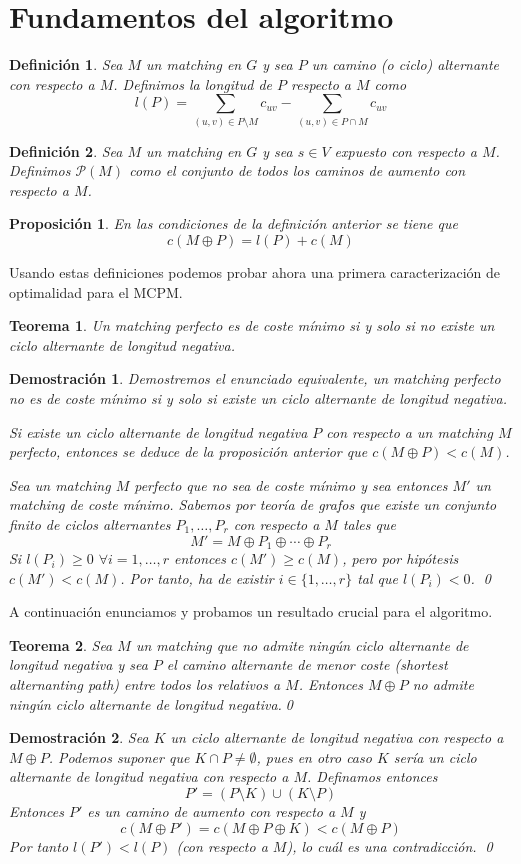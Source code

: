 \documentclass[twoside,a4paper,openright,12pt]{book}
\newtheorem{defi}{Definici\'on}[section]
\newtheorem{prop}{Proposici\'on}[section]
\newtheorem{thm}{Teorema}[section]
\newtheorem*{dem}{Demostración}
\begin{document}
\section{Fundamentos del algoritmo}
\begin{defi}
Sea $M$ un matching en $G$ y sea $P$ un camino (o ciclo) alternante con respecto a $M$. Definimos la longitud de $P$ respecto a $M$ como
$$
l(P) = \sum_{(u,v)\in P\setminus M}c_{uv} - \sum_{(u,v)\in P\cap M}c_{uv}
$$
\end{defi}
\begin{defi}
Sea $M$ un matching en $G$ y sea $s\in V$ expuesto con respecto a $M$. Definimos $\mathcal{P}(M)$ como el conjunto de todos los caminos de aumento con respecto a $M$.
\end{defi}
\begin{prop}
En las condiciones de la definición anterior se tiene que
$$
c(M\oplus P) = l(P) + c(M)
$$
\end{prop}

Usando estas definiciones podemos probar ahora una primera caracterización de optimalidad para el MCPM.
\begin{thm}
Un matching perfecto es de coste mínimo si y solo si no existe un ciclo alternante de longitud negativa.
\end{thm}
\begin{dem}
Demostremos el enunciado equivalente, un matching perfecto no es de coste mínimo si y solo si existe un ciclo alternante de longitud negativa.

Si existe un ciclo alternante de longitud negativa $P$ con respecto a un matching $M$ perfecto, entonces se deduce de la proposición anterior que $c(M\oplus P) < c(M)$. 

Sea un matching $M$ perfecto que no sea de coste mínimo y sea entonces $M'$ un matching de coste mínimo. Sabemos por teoría de grafos que existe un conjunto finito de ciclos alternantes $P_1,\dotsc,P_r$ con respecto a $M$ tales que
$$
M' = M \oplus P_1 \oplus \cdots \oplus P_r
$$
Si $l(P_i) \geq 0$ $\forall i=1,\dotsc, r$ entonces $c(M') \geq c(M)$, pero por hipótesis $c(M')<c(M)$. Por tanto, ha de existir $i \in \{1,\dotsc,r\}$ tal que $l(P_i)<0$. \qed
\end{dem}
A continuación enunciamos y probamos un resultado crucial para el algoritmo.
\begin{thm}
Sea $M$ un matching que no admite ningún ciclo alternante de longitud negativa y sea $P$ el camino alternante de menor coste (\textit{shortest alternanting path}) entre todos los relativos a $M$. Entonces $M\oplus P$ no admite ningún ciclo alternante de longitud negativa.\qed
\end{thm}
\begin{dem}
Sea $K$ un ciclo alternante de longitud negativa con respecto a $M\oplus P$. Podemos suponer que $K\cap P \neq \emptyset$, pues en otro caso $K$ sería un ciclo alternante de longitud negativa con respecto a $M$. Definamos entonces
$$
P' = (P\setminus K)\cup (K\setminus P)
$$
Entonces $P'$ es un camino de aumento con respecto a $M$ y
$$
c(M \oplus P') = c(M \oplus P \oplus K) < c(M \oplus P)
$$
Por tanto $l(P')<l(P)$ (con respecto a $M$), lo cuál es una contradicción.
\qed
\end{dem}
\end{document}
